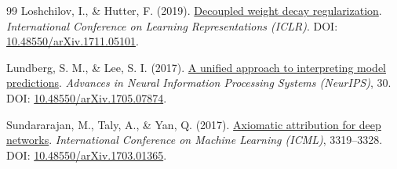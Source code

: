 \documentclass[11pt]{article}
\begin{document}
\begin{thebibliography}{99}
 Loshchilov, I., \& Hutter, F. (2019). \href{https://openreview.net/forum?id=Bkg6RiCqY7}{Decoupled weight decay regularization}. \textit{International Conference on Learning Representations (ICLR)}. DOI: \href{https://doi.org/10.48550/arXiv.1711.05101}{10.48550/arXiv.1711.05101}.

 Lundberg, S. M., \& Lee, S. I. (2017). \href{https://proceedings.neurips.cc/paper/2017/hash/8a20a8621978632d76c43dfd28b67767-Abstract.html}{A unified approach to interpreting model predictions}. \textit{Advances in Neural Information Processing Systems (NeurIPS)}, 30. DOI: \href{https://doi.org/10.48550/arXiv.1705.07874}{10.48550/arXiv.1705.07874}.

 Sundararajan, M., Taly, A., \& Yan, Q. (2017). \href{https://proceedings.mlr.press/v70/sundararajan17a.html}{Axiomatic attribution for deep networks}. \textit{International Conference on Machine Learning (ICML)}, 3319--3328. DOI: \href{https://doi.org/10.48550/arXiv.1703.01365}{10.48550/arXiv.1703.01365}.

\end{thebibliography}
\end{document}
